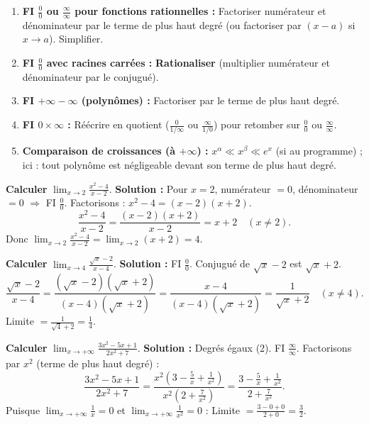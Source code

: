 \documentclass[11pt]{article}
\begin{document}
\begin{methode}
\begin{enumerate}
    \item \textbf{FI $\frac{0}{0}$ ou $\frac{\infty}{\infty}$ pour fonctions rationnelles :} Factoriser numérateur et dénominateur par le terme de plus haut degré (ou factoriser par $(x-a)$ si $x\to a$). Simplifier.
    \item \textbf{FI $\frac{0}{0}$ avec racines carrées :} \textbf{Rationaliser} (multiplier numérateur et dénominateur par le conjugué).
    \item \textbf{FI $+\infty - \infty$ (polynômes) :} Factoriser par le terme de plus haut degré.
    \item \textbf{FI $0 \times \infty$ :} Réécrire en quotient ($\frac{0}{1/\infty}$ ou $\frac{\infty}{1/0}$) pour retomber sur $\frac{0}{0}$ ou $\frac{\infty}{\infty}$.
    \item \textbf{Comparaison de croissances (à $+\infty$) :} $x^\alpha \ll x^\beta \ll e^x$ (si au programme) ; ici : tout polynôme est négligeable devant son terme de plus haut degré.
\end{enumerate}
\end{methode}

\begin{exoresolu}
\textbf{Calculer} $\lim_{x \to 2} \frac{x^2 - 4}{x - 2}$.
\textbf{Solution :}
Pour $x=2$, numérateur $=0$, dénominateur $=0$ $\Rightarrow$ FI $\frac{0}{0}$.
Factorisons : $x^2-4 = (x-2)(x+2)$.
\[
\frac{x^2-4}{x-2} = \frac{(x-2)(x+2)}{x-2} = x+2 \quad (x \neq 2).
\]
Donc $\lim_{x \to 2} \frac{x^2-4}{x-2} = \lim_{x \to 2} (x+2) = 4$.
\end{exoresolu}

\begin{exoresolu}
\textbf{Calculer} $\lim_{x \to 4} \frac{\sqrt{x} - 2}{x - 4}$.
\textbf{Solution :}
FI $\frac{0}{0}$. Conjugué de $\sqrt{x}-2$ est $\sqrt{x}+2$.
\[
\frac{\sqrt{x}-2}{x-4} = \frac{(\sqrt{x}-2)(\sqrt{x}+2)}{(x-4)(\sqrt{x}+2)} = \frac{x-4}{(x-4)(\sqrt{x}+2)} = \frac{1}{\sqrt{x}+2} \quad (x \neq 4).
\]
Limite $= \frac{1}{\sqrt{4}+2} = \frac{1}{4}$.
\end{exoresolu}

\begin{exoresolu}
\textbf{Calculer} $\lim_{x \to +\infty} \frac{3x^2 - 5x + 1}{2x^2 + 7}$.
\textbf{Solution :}
Degrés égaux (2). FI $\frac{\infty}{\infty}$.
Factorisons par $x^2$ (terme de plus haut degré) :
\[
\frac{3x^2 - 5x + 1}{2x^2 + 7} = \frac{x^2(3 - \frac{5}{x} + \frac{1}{x^2})}{x^2(2 + \frac{7}{x^2})} = \frac{3 - \frac{5}{x} + \frac{1}{x^2}}{2 + \frac{7}{x^2}}.
\]
Puisque $\lim_{x\to+\infty} \frac{1}{x} = 0$ et $\lim_{x\to+\infty} \frac{1}{x^2} = 0$ :
Limite $= \frac{3 - 0 + 0}{2 + 0} = \frac{3}{2}$.
\end{exoresolu}
\end{document}

